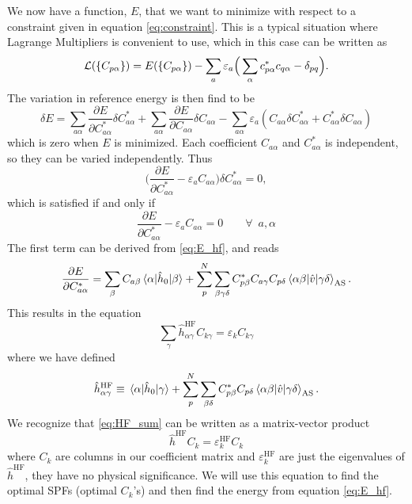 We now have a function, $E$, that we want to minimize with respect to a constraint given in equation \eqref{eq:constraint}. This is a typical situation where Lagrange Multipliers is convenient to use, which in this case can be written as
\begin{equation}
{\cal L}(\{C_{p\alpha}\})=E(\{C_{p\alpha}\})-\sum_a\varepsilon_a\Big(\sum_{\alpha}c_{p\alpha}^*c_{q\alpha}-\delta_{pq}\Big).
\end{equation}
The variation in reference energy is then find to be
\begin{equation}
\delta E=\sum_{a\alpha}\frac{\partial E}{\partial C_{a\alpha}^*}\delta C_{a\alpha}^*+\sum_{a\alpha}\frac{\partial E}{\partial C_{a\alpha}}\delta C_{a\alpha}-\sum_{a\alpha}\varepsilon_a(C_{a\alpha}\delta C_{a\alpha}^*+C_{a\alpha}^*\delta C_{a\alpha})
\label{eq:E_hf}
\end{equation}
which is zero when $E$ is minimized. Each coefficient $C_{a\alpha}$ and $C_{a\alpha}^*$ is independent, so they can be varied independently. Thus
\begin{equation}
\bigg(\frac{\partial E}{\partial C_{a\alpha}^*}-\varepsilon_aC_{a\alpha}\bigg)\delta C_{a\alpha}^*=0,
\end{equation}
which is satisfied if and only if
\begin{equation}
\frac{\partial E}{\partial C_{a\alpha}^*}-\varepsilon_aC_{a\alpha}=0\qquad\forall\,\,\, a,\alpha
\end{equation}
The first term can be derived from \eqref{eq:E_hf}, and reads
\begin{equation}
\frac{\partial E}{\partial C_{a\alpha}^*}=\sum_{\beta}C_{a\beta}\mel{\alpha}{\hat{h}_0}{\beta}+\sum_p^N\sum_{\beta\gamma\delta}C_{p\beta}^*C_{a\gamma}C_{p\delta}\mel{\alpha\beta}{\hat{v}}{\gamma\delta}_{\text{AS}}.
\end{equation}
This results in the equation
\begin{equation}
\sum_{\gamma}\hat{h}_{\alpha\gamma}^{\text{HF}}C_{k\gamma}=\varepsilon_kC_{k\gamma}
\label{eq:HF_sum}
\end{equation}
where we have defined
\begin{equation}
\hat{h}_{\alpha\gamma}^{\text{HF}}\equiv\mel{\alpha}{\hat{h}_0}{\gamma}+\sum_p^N\sum_{\beta\delta}C_{p\beta}^*C_{p\delta}\mel{\alpha\beta}{\hat{v}}{\gamma\delta}_{\text{AS}}.
\end{equation}
We recognize that \eqref{eq:HF_sum} can be written as a matrix-vector product
\begin{equation}
\hat{h}^{\text{HF}}C_k=\varepsilon_k^{\text{HF}}C_k
\end{equation}
where $C_k$ are columns in our coefficient matrix and $\varepsilon_k^{\text{HF}}$ are just the eigenvalues of $\hat{h}^{\text{HF}}$, they have no physical significance. We will use this equation to find the optimal SPFs (optimal $C_k$'s) and then find the energy from equation \eqref{eq:E_hf}.

